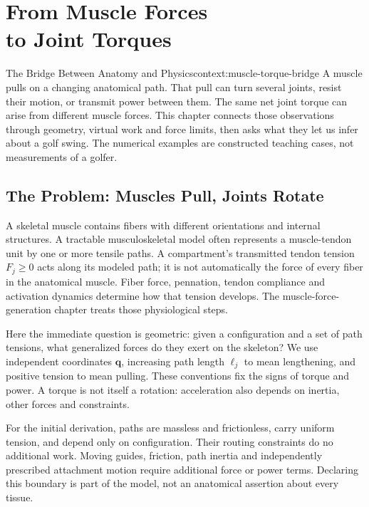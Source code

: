 \chapter[From Muscle Forces to Joint Torques]{From Muscle Forces\\to Joint Torques}
\label{ch:muscle-to-torque}
\raggedbottom
{}

\begin{laymansbox}{The Bridge Between Anatomy and Physics}{context:muscle-torque-bridge}
A muscle pulls on a changing anatomical path. That pull can turn several joints, resist their motion, or transmit power between them. The same net joint torque can arise from different muscle forces. This chapter connects those observations through geometry, virtual work and force limits, then asks what they let us infer about a golf swing. The numerical examples are constructed teaching cases, not measurements of a golfer.
\end{laymansbox}

\section{The Problem: Muscles Pull, Joints Rotate}
\label{sec:muscle-torque-problem}

A skeletal muscle contains fibers with different orientations and internal structures. A tractable musculoskeletal model often represents a muscle-tendon unit by one or more tensile paths. A compartment's transmitted tendon tension $F_j\geq0$ acts along its modeled path; it is not automatically the force of every fiber in the anatomical muscle. Fiber force, pennation, tendon compliance and activation dynamics determine how that tension develops. The muscle-force-generation chapter treats those physiological steps.

Here the immediate question is geometric: given a configuration and a set of path tensions, what generalized forces do they exert on the skeleton? We use independent coordinates $\bm q$, increasing path length $\ell_j$ to mean lengthening, and positive tension to mean pulling. These conventions fix the signs of torque and power. A torque is not itself a rotation: acceleration also depends on inertia, other forces and constraints.

For the initial derivation, paths are massless and frictionless, carry uniform tension, and depend only on configuration. Their routing constraints do no additional work. Moving guides, friction, path inertia and independently prescribed attachment motion require additional force or power terms. Declaring this boundary is part of the model, not an anatomical assertion about every tissue.

